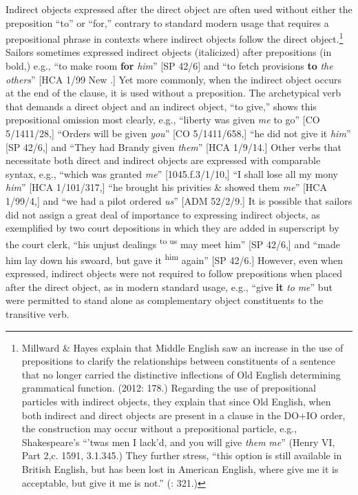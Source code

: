   Indirect objects expressed after the direct object are often used without either the preposition “to” or “for,” contrary to standard modern usage that requires a prepositional phrase in contexts where indirect objects follow the direct object.\footnote{Millward \& Hayes explain that Middle English saw an increase in the use of prepositions to clarify the relationships between constituents of a sentence that no longer carried the distinctive inflections of Old English determining grammatical function. (2012: 178.) Regarding the use of prepositional particles with indirect objects, they explain that since Old English, when both indirect and direct objects are present in a clause in the DO+IO order, the construction may occur without a prepositional particle, e.g., Shakespeare’s “’twas men I lack’d, and you will give \textit{them} \textit{me}” (Henry VI, Part 2,c. 1591, 3.1.345.) They further stress, “this option is still available in British English, but has been lost in American English, where give me it is acceptable, but give it me is not.” (\citealt{MillwardHayes2012}: 321.)} Sailors sometimes expressed indirect objects (italicized) after prepositions (in bold,) e.g., “to make room \textbf{for} \textit{him}” [SP 42/6] and “to fetch provisions \textbf{to} \textit{the} \textit{others}” [HCA 1/99 New \citealt{Providence1722}.] Yet more commonly, when the indirect object occurs at the end of the clause, it is used without a preposition. The archetypical verb that demands a direct object and an indirect object, “to give,” shows this prepositional omission most clearly, e.g., “liberty was given \textit{me} to go” [CO 5/1411/28,] “Orders will be given \textit{you}” [CO 5/1411/658,] “he did not give it \textit{him}” [SP 42/6,] and “They had Brandy given \textit{them}” [HCA 1/9/14.] Other verbs that necessitate both direct and indirect objects are expressed with comparable syntax, e.g., “which was granted \textit{me}” [1045.f.3/1/10,] “I shall lose all my mony \textit{him}” [HCA 1/101/317,] “he brought his privities \& showed them \textit{me}” [HCA 1/99/4,] and “we had a pilot ordered \textit{us}” [ADM 52/2/9.] It is possible that sailors did not assign a great deal of importance to expressing indirect objects, as exemplified by two court depositions in which they are added in superscript by the court clerk, “his unjust dealings \textsuperscript{to us} may meet him” [SP 42/6,] and “made him lay down his swoard, but gave it \textsuperscript{him} again” [SP 42/6.] However, even when expressed, indirect objects were not required to follow prepositions when placed after the direct object, as in modern standard usage, e.g., “give \textbf{it} \textit{to} \textit{me}” but were permitted to stand alone as complementary object constituents to the transitive verb. 

